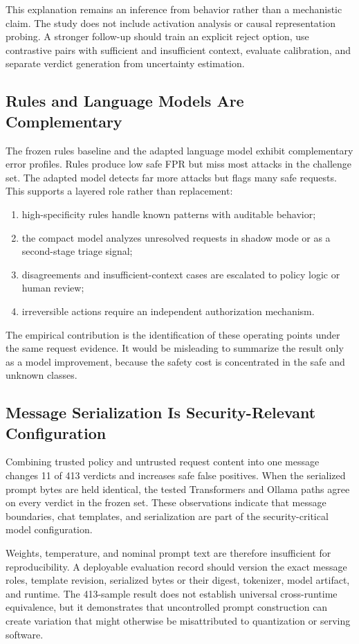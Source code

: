 This explanation remains an inference from behavior rather than a mechanistic claim. The study does not include activation analysis or causal representation probing. A stronger follow-up should train an explicit reject option, use contrastive pairs with sufficient and insufficient context, evaluate calibration, and separate verdict generation from uncertainty estimation.

\subsection{Rules and Language Models Are Complementary}
The frozen rules baseline and the adapted language model exhibit complementary error profiles. Rules produce low safe FPR but miss most attacks in the challenge set. The adapted model detects far more attacks but flags many safe requests. This supports a layered role rather than replacement:
\begin{enumerate}
    \item high-specificity rules handle known patterns with auditable behavior;
    \item the compact model analyzes unresolved requests in shadow mode or as a second-stage triage signal;
    \item disagreements and insufficient-context cases are escalated to policy logic or human review;
    \item irreversible actions require an independent authorization mechanism.
\end{enumerate}

The empirical contribution is the identification of these operating points under the same request evidence. It would be misleading to summarize the result only as a model improvement, because the safety cost is concentrated in the safe and unknown classes.

\subsection{Message Serialization Is Security-Relevant Configuration}
Combining trusted policy and untrusted request content into one message changes 11 of 413 verdicts and increases safe false positives. When the serialized prompt bytes are held identical, the tested Transformers and Ollama paths agree on every verdict in the frozen set. These observations indicate that message boundaries, chat templates, and serialization are part of the security-critical model configuration.

Weights, temperature, and nominal prompt text are therefore insufficient for reproducibility. A deployable evaluation record should version the exact message roles, template revision, serialized bytes or their digest, tokenizer, model artifact, and runtime. The 413-sample result does not establish universal cross-runtime equivalence, but it demonstrates that uncontrolled prompt construction can create variation that might otherwise be misattributed to quantization or serving software.

